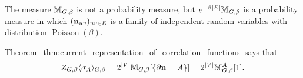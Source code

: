\begin{corollary}
        The measure $\mathbb M_{G,\beta}$ is not a probability measure,
        but $e^{-\beta|E|}\mathbb M_{G,\beta}$ is a probability measure
        in which $(\mathbf{n}_{uv})_{uv\in E}$ is a family of independent
        random variables with distribution $\operatorname{Poisson}(\beta)$.
\end{corollary}

\begin{corollary}
    \label{cor:current_representation_of_correlation_functions}
    Theorem~\ref{thm:current_representation_of_correlation_functions}
    says that 
    \[
        Z_{G,\beta}\langle\sigma_A\rangle_{G,\beta}
        =2^{|V|}\mathbb M_{G,\beta}[\{\partial\mathbf{n}=A\}]
        =2^{|V|}\mathbb M_{G,\beta}^A[1].
    \]
\end{corollary}
